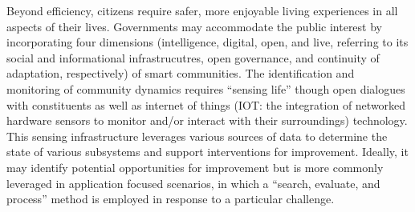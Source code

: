 Beyond efficiency, citizens require safer, more enjoyable living experiences in all aspects of their lives. Governments may accommodate the public interest\cite{Afzalan2017}  %
by incorporating four dimensions (intelligence, digital, open, and live, referring to its social and informational infrastrucutres, open governance, and continuity of adaptation, respectively) of  smart communities\cite{Oliveira2021}. %
The identification and monitoring of community dynamics requires ``sensing life'' though open dialogues with constituents as well as internet of things (IOT: the integration of networked hardware sensors to monitor and/or interact with their surroundings) technology\cite{Roche2012}. %
This sensing infrastructure leverages various sources of data to determine the state of various subsystems and support interventions for improvement. %
Ideally, it may identify potential opportunities for improvement but is more commonly leveraged in application focused scenarios, in which a ``search, evaluate, and process'' method is employed in response to a particular challenge\cite{Jiang2020}. %

